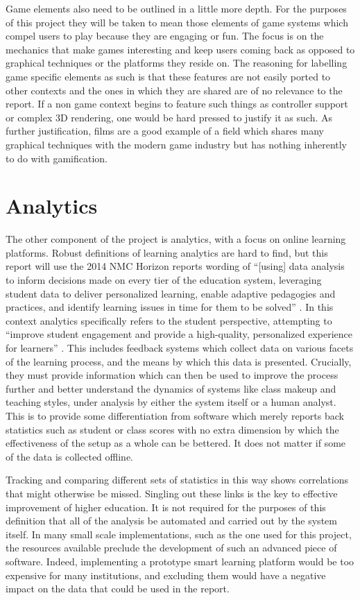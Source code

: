 \documentclass[12pt,a4paper,twoside]{report}
\begin{document}
Game elements also need to be outlined in a little more depth. For the purposes of this project they will be taken to mean those elements of game systems which compel users to play because they are engaging or fun. The focus is on the mechanics that make games interesting and keep users coming back as opposed to graphical techniques or the platforms they reside on. The reasoning for labelling game specific elements as such is that these features are not easily ported to other contexts and the ones in which they are shared are of no relevance to the report. If a non game context begins to feature such things as controller support or complex 3D rendering, one would be hard pressed to justify it as such. As further justification, films are a good example of a field which shares many graphical techniques with the modern game industry but has nothing inherently to do with gamification.

\section{Analytics}
The other component of the project is analytics, with a focus on online learning platforms. Robust definitions of learning analytics are hard to find, but this report will use the 2014 NMC Horizon reports wording of ``[using] data analysis to inform decisions made on every tier of the education system, leveraging student data to deliver personalized learning, enable adaptive pedagogies and practices, and identify learning issues in time for them to be solved'' \cite{johnson2014nmc}. In this context analytics specifically refers to the student perspective, attempting to ``improve student engagement and provide a high-quality, personalized experience for learners'' \cite{johnson2014nmc}. This includes feedback systems which collect data on various facets of the learning process, and the means by which this data is presented. Crucially, they must provide information which can then be used to improve the process further and better understand the dynamics of systems like class makeup and teaching styles, under analysis by either the system itself or a human analyst. This is to provide some differentiation from software which merely reports back statistics such as student or class scores with no extra dimension by which the effectiveness of the setup as a whole can be bettered. It does not matter if some of the data is collected offline.

Tracking and comparing different sets of statistics in this way shows correlations that might otherwise be missed. Singling out these links is the key to effective improvement of higher education. It is not required for the purposes of this definition that all of the analysis be automated and carried out by the system itself. In many small scale implementations, such as the one used for this project, the resources available preclude the development of such an advanced piece of software. Indeed, implementing a prototype smart learning platform would be too expensive for many institutions, and excluding them would have a negative impact on the data that could be used in the report.
\end{document}
